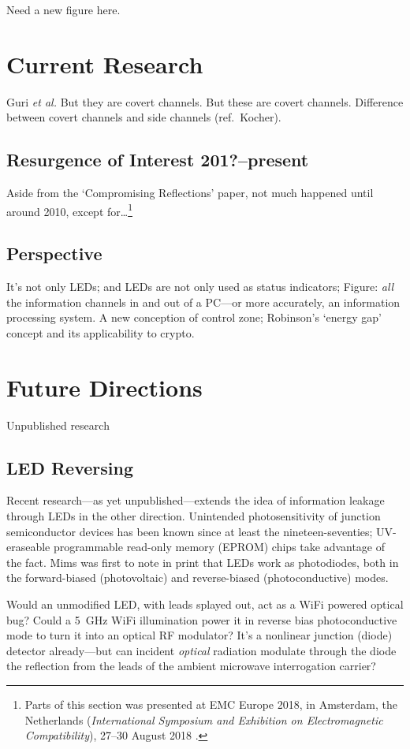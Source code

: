 \documentclass[a4paper,twoside,11pt]{book}
\begin{document}
Need a new figure here.

\section{Current Research}
Guri \emph{et al.} But they are covert channels. But these are covert
channels. Difference between covert channels and side channels
(ref.\ Kocher).
\subsection{Resurgence of Interest 201?--present}
Aside from the `Compromising Reflections' paper, not much happened until
around 2010, except for\ldots\footnote{Parts of this section was presented at
EMC Europe 2018, in Amsterdam, the Netherlands (\emph{International Symposium
and Exhibition on Electromagnetic Compatibility}), 27--30 August 2018
\cite{Loughry2018a}.}
\subsection{Perspective}
It's not only LEDs; and LEDs are not only used as status indicators; Figure:
\emph{all} the information channels in and out of a PC---or more accurately,
an information processing system. A new conception of control zone;
Robinson's `energy gap' concept and its applicability to crypto.
\section{Future Directions}
Unpublished research
\subsection{LED Reversing}
Recent research---as yet unpublished---extends the idea of information leakage
through LEDs in the other direction. Unintended photosensitivity of junction
semiconductor devices has been known since at least the nineteen-seventies;
UV-eraseable programmable read-only memory (EPROM) chips take advantage of the
fact. Mims \citeyear{Mims1973b} was first to note in print that LEDs work as
photodiodes, both in the forward-biased (photovoltaic) and reverse-biased
(photoconductive) modes.

Would an unmodified LED, with leads splayed out, act as a WiFi powered
optical bug? Could a \SI{5}{\giga\hertz} WiFi illumination power it in
reverse bias photoconductive mode to turn it into an optical RF
modulator? It's a nonlinear junction (diode) detector already---but can
incident \emph{optical} radiation modulate through the diode the reflection
from the leads of the ambient microwave interrogation carrier?
\end{document}
